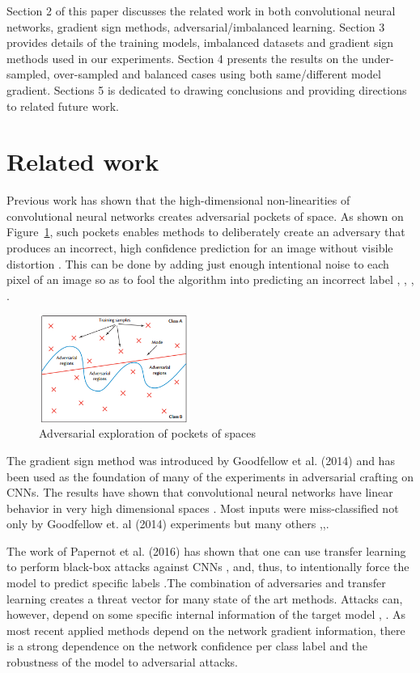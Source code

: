 \documentclass[runningheads,a4paper]{llncs}
\begin{document}
Section 2 of this paper discusses the related work in both convolutional neural networks, gradient sign methods, adversarial/imbalanced learning. Section 3 provides details of the training models, imbalanced datasets and gradient sign methods used in our experiments. Section 4 presents the results on the under-sampled, over-sampled and balanced cases using both same/different model gradient. Sections 5 is dedicated to drawing conclusions and providing directions to related future work.
\section{Related work}


Previous work has shown that the high-dimensional non-linearities of convolutional neural networks \cite{lawrence1997face} creates adversarial pockets of space. As shown on Figure~\ref{fig:adv_space}, such pockets enables methods to deliberately create an adversary that produces an incorrect, high confidence prediction for an image without visible distortion \cite{papernot_thesis_2016}. This can be done by adding just enough intentional noise to each pixel of an image so as to fool the algorithm into predicting an incorrect label \cite{goodfellow2014}, \cite{goodfellow2016}, \cite{papernot2016transf}, \cite{szegedy2013}.

\begin{figure}
	\centering
	\includegraphics[height=3.5cm]{adv_space.png}
	\caption{Adversarial exploration of pockets of spaces \cite{papernot_2017}}
	\label{fig:adv_space}
\end{figure}

The gradient sign method was introduced by Goodfellow et al. (2014) and has been used as the foundation of many of the experiments in adversarial crafting on CNNs. The results have shown that convolutional neural networks have linear behavior in very high dimensional spaces \cite{goodfellow2014}.  Most inputs were miss-classified not only by Goodfellow et. al (2014) experiments but many others \cite{billovits},\cite{goodfellow2016},\cite{papernot2016}.

The work of Papernot et al. (2016) has shown that one can use transfer learning to perform black-box attacks against CNNs \cite{papernot2016transf}, \cite{yosinski2014transferable} and, thus, to intentionally force the model to predict specific labels .The combination of adversaries and transfer learning creates a threat vector for many state of the art methods. Attacks can, however, depend on some specific internal information of the target model \cite{lowd2005}, \cite{papernot2016transf}. As most recent applied methods depend on the network gradient information, there is a strong dependence on the network confidence per class label and the robustness of the model to adversarial attacks.
\end{document}
